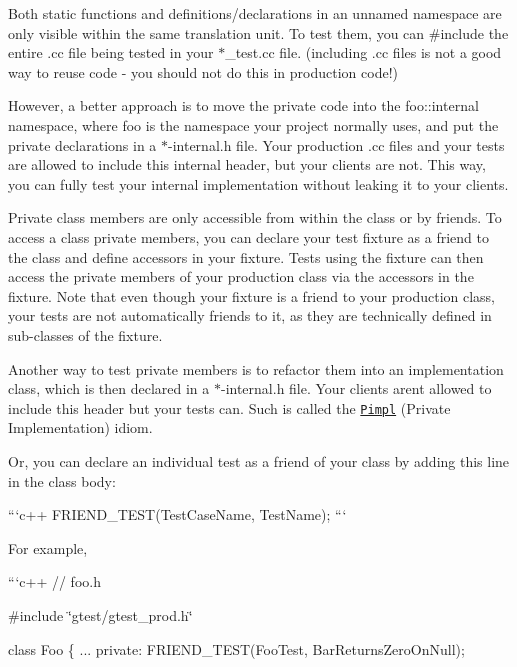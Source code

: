 \begin{DoxyItemize}
\item Both static functions and definitions/declarations in an unnamed namespace are only visible within the same translation unit. To test them, you can {\ttfamily \#include} the entire {\ttfamily .cc} file being tested in your {\ttfamily $\ast$\+\_\+test.cc} file. (including {\ttfamily .cc} files is not a good way to reuse code -\/ you should not do this in production code!)

However, a better approach is to move the private code into the {\ttfamily foo\+::internal} namespace, where {\ttfamily foo} is the namespace your project normally uses, and put the private declarations in a {\ttfamily $\ast$-\/internal.h} file. Your production {\ttfamily .cc} files and your tests are allowed to include this internal header, but your clients are not. This way, you can fully test your internal implementation without leaking it to your clients.
\item Private class members are only accessible from within the class or by friends. To access a class\textquotesingle{} private members, you can declare your test fixture as a friend to the class and define accessors in your fixture. Tests using the fixture can then access the private members of your production class via the accessors in the fixture. Note that even though your fixture is a friend to your production class, your tests are not automatically friends to it, as they are technically defined in sub-\/classes of the fixture.

Another way to test private members is to refactor them into an implementation class, which is then declared in a {\ttfamily $\ast$-\/internal.h} file. Your clients aren\textquotesingle{}t allowed to include this header but your tests can. Such is called the \href{https://www.gamedev.net/articles/programming/general-and-gameplay-programming/the-c-pimpl-r1794/}{\tt Pimpl} (Private Implementation) idiom.

Or, you can declare an individual test as a friend of your class by adding this line in the class body\+:

```c++ F\+R\+I\+E\+N\+D\+\_\+\+T\+E\+S\+T(\+Test\+Case\+Name, Test\+Name); ```

For example,

```c++ // foo.\+h

\#include \char`\"{}gtest/gtest\+\_\+prod.\+h\char`\"{}

class Foo \{ ... private\+: F\+R\+I\+E\+N\+D\+\_\+\+T\+E\+S\+T(\+Foo\+Test, Bar\+Returns\+Zero\+On\+Null);


\end{DoxyItemize}

